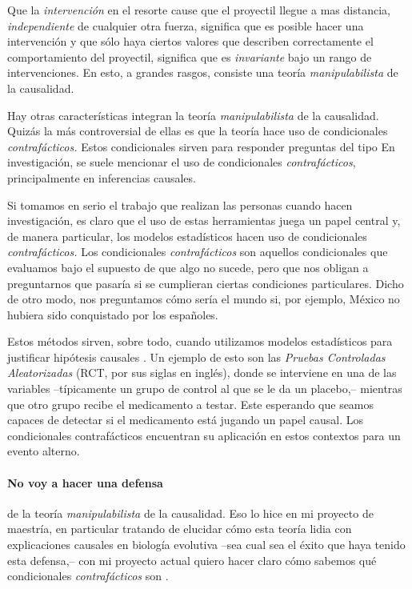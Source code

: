 Que la \emph{intervención} en el resorte cause que el proyectil llegue a mas distancia, \emph{independiente} de cualquier otra fuerza, significa que es posible hacer una intervención  y que sólo haya ciertos valores que describen correctamente el comportamiento del proyectil, significa que es \emph{invariante} bajo un rango de intervenciones.
En esto, a grandes rasgos, consiste una teoría \emph{manipulabilista} de la causalidad.

Hay otras características integran la teoría \emph{manipulabilista} de la causalidad.
Quizás la más controversial de ellas es que la teoría hace uso de condicionales \emph{contrafácticos.}
Estos condicionales sirven para responder preguntas del tipo 
En investigación, se suele mencionar el uso de condicionales \emph{contrafácticos}, principalmente en inferencias causales.

Si tomamos en serio el trabajo que realizan las personas cuando hacen investigación, es claro que el uso de estas herramientas juega un papel central y, de manera particular, los modelos estadísticos hacen uso de condicionales \emph{contrafácticos.}
Los condicionales \emph{contrafácticos} son aquellos condicionales que evaluamos bajo el supuesto de que algo no sucede, pero que nos obligan a preguntarnos que pasaría si se cumplieran ciertas condiciones particulares.
Dicho de otro modo, nos preguntamos cómo sería el mundo si, por ejemplo, México no hubiera sido conquistado por los españoles.

Estos métodos sirven, sobre todo, cuando utilizamos modelos estadísticos para justificar hipótesis causales \parencite{Pearl2016, Pearl2018}.
Un ejemplo de esto son las \emph{Pruebas Controladas Aleatorizadas} (RCT, por sus siglas en inglés), donde se interviene en una de las variables --típicamente un grupo de control al que se le da un placebo,-- mientras que otro grupo recibe el medicamento a testar.
Este esperando que seamos capaces de detectar si el medicamento está jugando un papel causal.
Los condicionales contrafácticos encuentran su aplicación en estos contextos para  un evento alterno.

\paragraph{No voy a hacer una defensa} de la teoría \emph{manipulabilista} de la causalidad.
Eso lo hice en mi proyecto de maestría, en particular tratando de elucidar cómo esta teoría lidia con explicaciones causales en biología evolutiva --sea cual sea el éxito que haya tenido esta defensa,-- con
mi proyecto actual quiero hacer claro cómo sabemos qué condicionales \emph{contrafácticos} son .

